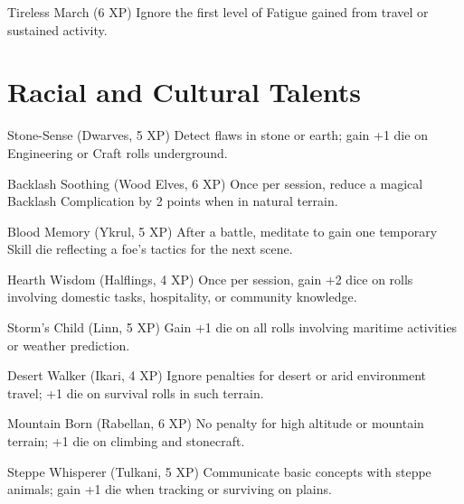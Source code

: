 \documentclass[11pt]{article}
\begin{document}
\begin{talentbox}{Tireless March (6 XP)}
Ignore the first level of Fatigue gained from travel or sustained activity.
\end{talentbox}

\section*{Racial and Cultural Talents}

\begin{talentbox}{Stone-Sense (Dwarves, 5 XP)}
Detect flaws in stone or earth; gain +1 die on Engineering or Craft rolls underground.
\end{talentbox}

\begin{talentbox}{Backlash Soothing (Wood Elves, 6 XP)}
Once per session, reduce a magical Backlash Complication by 2 points when in natural terrain.
\end{talentbox}

\begin{talentbox}{Blood Memory (Ykrul, 5 XP)}
After a battle, meditate to gain one temporary Skill die reflecting a foe's tactics for the next scene.
\end{talentbox}

\begin{talentbox}{Hearth Wisdom (Halflings, 4 XP)}
Once per session, gain +2 dice on rolls involving domestic tasks, hospitality, or community knowledge.
\end{talentbox}

\begin{talentbox}{Storm's Child (Linn, 5 XP)}
Gain +1 die on all rolls involving maritime activities or weather prediction.
\end{talentbox}

\begin{talentbox}{Desert Walker (Ikari, 4 XP)}
Ignore penalties for desert or arid environment travel; +1 die on survival rolls in such terrain.
\end{talentbox}

\begin{talentbox}{Mountain Born (Rabellan, 6 XP)}
No penalty for high altitude or mountain terrain; +1 die on climbing and stonecraft.
\end{talentbox}

\begin{talentbox}{Steppe Whisperer (Tulkani, 5 XP)}
Communicate basic concepts with steppe animals; gain +1 die when tracking or surviving on plains.
\end{talentbox}
\end{document}
